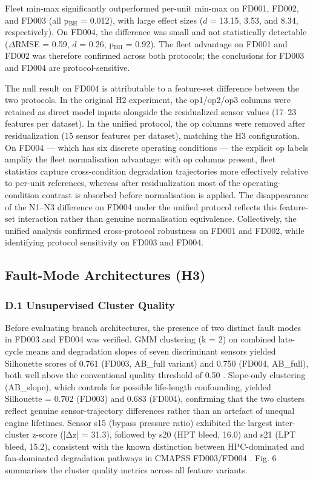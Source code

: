 \documentclass[preprint,10pt]{elsarticle}
\begin{document}
Fleet min-max significantly outperformed per-unit min-max on FD001, FD002, and FD003 (all p$_\text{BH}$ = 0.012), with large effect sizes ($d$ = 13.15, 3.53, and 8.34, respectively). On FD004, the difference was small and not statistically detectable ($\Delta$RMSE = 0.59, $d$ = 0.26, p$_\text{BH}$ = 0.92). The fleet advantage on FD001 and FD002 was therefore confirmed across both protocols; the conclusions for FD003 and FD004 are protocol-sensitive.

The null result on FD004 is attributable to a feature-set difference between the two protocols. In the original H2 experiment, the op1/op2/op3 columns were retained as direct model inputs alongside the residualized sensor values (17--23 features per dataset). In the unified protocol, the op columns were removed after residualization (15 sensor features per dataset), matching the H3 configuration. On FD004 --- which has six discrete operating conditions --- the explicit op labels amplify the fleet normalisation advantage: with op columns present, fleet statistics capture cross-condition degradation trajectories more effectively relative to per-unit references, whereas after residualization most of the operating-condition contrast is absorbed before normalisation is applied. The disappearance of the N1--N3 difference on FD004 under the unified protocol reflects this feature-set interaction rather than genuine normalisation equivalence. Collectively, the unified analysis confirmed cross-protocol robustness on FD001 and FD002, while identifying protocol sensitivity on FD003 and FD004.

\subsection{Fault-Mode Architectures (H3)}

\subsubsection{D.1 Unsupervised Cluster Quality}

Before evaluating branch architectures, the presence of two distinct fault modes in FD003 and FD004 was verified. GMM clustering (k = 2) on combined late-cycle means and degradation slopes of seven discriminant sensors yielded Silhouette scores of 0.761 (FD003, AB_full variant) and 0.750 (FD004, AB_full), both well above the conventional quality threshold of 0.50 \cite{ref35}. Slope-only clustering (AB_slope), which controls for possible life-length confounding, yielded Silhouette = 0.702 (FD003) and 0.683 (FD004), confirming that the two clusters reflect genuine sensor-trajectory differences rather than an artefact of unequal engine lifetimes. Sensor s15 (bypass pressure ratio) exhibited the largest inter-cluster z-score (|Δz| = 31.3), followed by s20 (HPT bleed, 16.0) and s21 (LPT bleed, 15.2), consistent with the known distinction between HPC-dominated and fan-dominated degradation pathways in CMAPSS FD003/FD004 \cite{ref36}. Fig. 6 summarises the cluster quality metrics across all feature variants.
\end{document}
